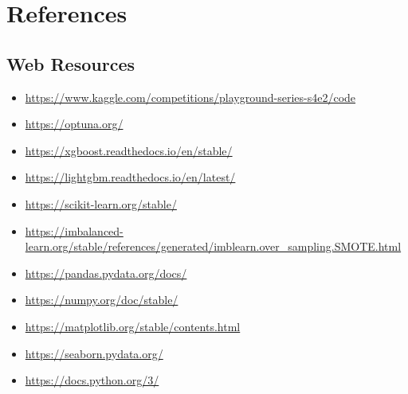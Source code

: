 \documentclass[12pt,a4paper]{report}
\begin{document}
    {
        \chapter*{References}
        \printbibliography

        \vspace{1em}
        \section*{Web Resources}

        \begin{itemize}
            \item \url{https://www.kaggle.com/competitions/playground-series-s4e2/code}
            \item \url{https://optuna.org/}
            \item \url{https://xgboost.readthedocs.io/en/stable/}
            \item \url{https://lightgbm.readthedocs.io/en/latest/}
            \item \url{https://scikit-learn.org/stable/}
            \item \url{https://imbalanced-learn.org/stable/references/generated/imblearn.over_sampling.SMOTE.html}
            \item \url{https://pandas.pydata.org/docs/}
            \item \url{https://numpy.org/doc/stable/}
            \item \url{https://matplotlib.org/stable/contents.html}
            \item \url{https://seaborn.pydata.org/}
            \item \url{https://docs.python.org/3/}
        \end{itemize}
    }
\end{document}
